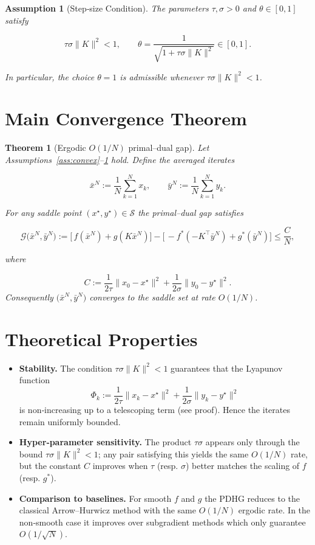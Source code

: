 \documentclass[11pt]{article}
\newtheorem{theorem}{Theorem}
\newtheorem{assumption}{Assumption}
\newcommand{\gap}{\mathcal{G}}
\begin{document}
\begin{assumption}[Step‑size Condition]\label{ass:steps}
The parameters $\tau,\sigma>0$ and $\theta\in[0,1]$ satisfy  

\[
\tau\sigma\|K\|^{2}<1,\qquad \theta=\frac{1}{\sqrt{1+\tau\sigma\|K\|^{2}}}\in[0,1].
\tag{5}
\]

In particular, the choice $\theta=1$ is admissible whenever $\tau\sigma\|K\|^{2}<1$.
\end{assumption}

\section*{Main Convergence Theorem}
\begin{theorem}[Ergodic $O(1/N)$ primal–dual gap]\label{thm:ergodic}
Let Assumptions~\ref{ass:convex}–\ref{ass:steps} hold.  
Define the averaged iterates  

\[
\bar{x}^{N}:=\frac{1}{N}\sum_{k=1}^{N}x_{k},\qquad
\bar{y}^{N}:=\frac{1}{N}\sum_{k=1}^{N}y_{k}.
\]

For any saddle point $(x^{\star},y^{\star})\in\mathcal{S}$ the primal–dual gap satisfies  

\[
\gap\big(\bar{x}^{N},\bar{y}^{N}\big)
:=\big[\,f(\bar{x}^{N})+g(K\bar{x}^{N})\big]
-\big[\, -f^{*}(-K^{\top}\bar{y}^{N})+g^{*}(\bar{y}^{N})\big]
\le
\frac{C}{N},
\tag{6}
\]

where  

\[
C:=\frac{1}{2\tau}\|x_{0}-x^{\star}\|^{2}
      +\frac{1}{2\sigma}\|y_{0}-y^{\star}\|^{2}.
\]
Consequently $\big(\bar{x}^{N},\bar{y}^{N}\big)$ converges to the saddle set at rate $O(1/N)$.
\end{theorem}

\section*{Theoretical Properties}
\begin{itemize}
\item \textbf{Stability.} The condition $\tau\sigma\|K\|^{2}<1$ guarantees that the Lyapunov function 
\[
\Phi_{k}:=\frac{1}{2\tau}\|x_{k}-x^{\star}\|^{2}
          +\frac{1}{2\sigma}\|y_{k}-y^{\star}\|^{2}
\]
is non‑increasing up to a telescoping term (see proof). Hence the iterates remain uniformly bounded.
\item \textbf{Hyper‑parameter sensitivity.} The product $\tau\sigma$ appears only through the bound $\tau\sigma\|K\|^{2}<1$; any pair satisfying this yields the same $O(1/N)$ rate, but the constant $C$ improves when $\tau$ (resp. $\sigma$) better matches the scaling of $f$ (resp. $g^{*}$).
\item \textbf{Comparison to baselines.} For smooth $f$ and $g$ the PDHG reduces to the classical Arrow–Hurwicz method with the same $O(1/N)$ ergodic rate. In the non‑smooth case it improves over subgradient methods which only guarantee $O(1/\sqrt{N})$.
\end{itemize}
\end{document}
